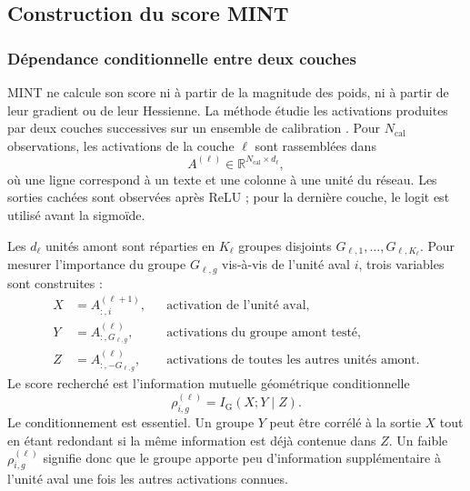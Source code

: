 \subsection{Construction du score MINT}
\label{ssec:methode_mint}

\subsubsection{Dépendance conditionnelle entre deux couches}

MINT ne calcule son score ni à partir de la magnitude des poids, ni à partir de
leur gradient ou de leur Hessienne. La méthode étudie les activations produites
par deux couches successives sur un ensemble de calibration
\cite{ganesh2020mint}. Pour $N_{\mathrm{cal}}$ observations, les activations de
la couche $\ell$ sont rassemblées dans
\begin{equation}
    A^{(\ell)}\in\mathbb{R}^{N_{\mathrm{cal}}\times d_{\ell}},
\end{equation}
où une ligne correspond à un texte et une colonne à une unité du réseau. Les
sorties cachées sont observées après ReLU ; pour la dernière couche, le logit
est utilisé avant la sigmoïde.

Les $d_{\ell}$ unités amont sont réparties en $K_{\ell}$ groupes disjoints
$G_{\ell,1},\ldots,G_{\ell,K_{\ell}}$. Pour mesurer l'importance du groupe
$G_{\ell,g}$ vis-à-vis de l'unité aval $i$, trois variables sont construites :
\begin{align}
    X &= A^{(\ell+1)}_{:,i},
        & &\text{activation de l'unité aval},\\
    Y &= A^{(\ell)}_{:,G_{\ell,g}},
        & &\text{activations du groupe amont testé},\\
    Z &= A^{(\ell)}_{:,-G_{\ell,g}},
        & &\text{activations de toutes les autres unités amont}.
    \label{eq:triplet_mint}
\end{align}
Le score recherché est l'information mutuelle géométrique conditionnelle
\begin{equation}
    \rho_{i,g}^{(\ell)}
    =I_{\mathrm{G}}(X;Y\mid Z).
    \label{eq:score_mint_abstrait}
\end{equation}
Le conditionnement est essentiel. Un groupe $Y$ peut être corrélé à la sortie
$X$ tout en étant redondant si la même information est déjà contenue dans
$Z$. Un faible $\rho_{i,g}^{(\ell)}$ signifie donc que le groupe apporte peu
d'information supplémentaire à l'unité aval une fois les autres activations
connues.

